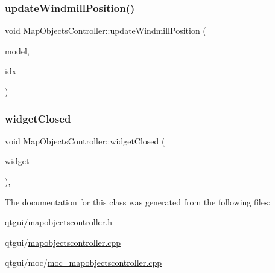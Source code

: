 \mbox{\label{class_map_objects_controller_a6aaeadbd4e451698641bf61e926a2ae1}} 
\subsubsection{\texorpdfstring{updateWindmillPosition()}{updateWindmillPosition()}}
{\footnotesize\ttfamily void Map\+Objects\+Controller\+::update\+Windmill\+Position (\begin{DoxyParamCaption}\item[{int}]{model,  }\item[{int}]{idx }\end{DoxyParamCaption})}

\mbox{\label{class_map_objects_controller_a7749993f9346e42a40200002956ff024}} 
\subsubsection{\texorpdfstring{widgetClosed}{widgetClosed}}
{\footnotesize\ttfamily void Map\+Objects\+Controller\+::widget\+Closed (\begin{DoxyParamCaption}\item[{Q\+Object $\ast$}]{widget }\end{DoxyParamCaption})\hspace{0.3cm}{\ttfamily [protected]}, {\ttfamily [slot]}}



The documentation for this class was generated from the following files\+:\begin{DoxyCompactItemize}
\item 
qtgui/\mbox{\hyperlink{mapobjectscontroller_8h}{mapobjectscontroller.\+h}}\item 
qtgui/\mbox{\hyperlink{mapobjectscontroller_8cpp}{mapobjectscontroller.\+cpp}}\item 
qtgui/moc/\mbox{\hyperlink{moc__mapobjectscontroller_8cpp}{moc\+\_\+mapobjectscontroller.\+cpp}}\end{DoxyCompactItemize}
